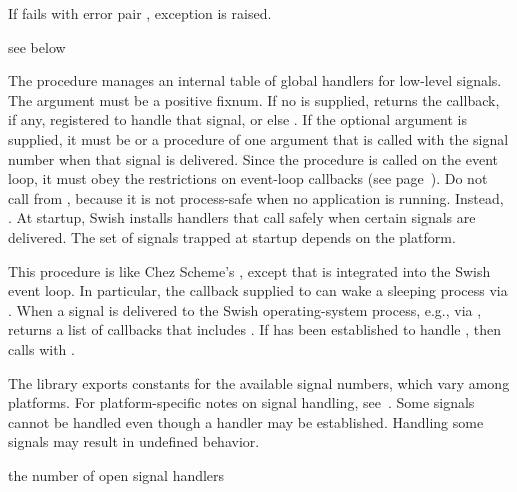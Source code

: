 If  fails with error pair , exception  is raised.

\begin{procedure}
\end{procedure}
\returns{} see below

The  procedure manages an internal table of
global handlers for low-level signals.
The  argument must be a positive fixnum.
If no  is supplied,  returns the
callback, if any, registered to handle that signal, or else .
If the optional  argument is supplied, it must be  or
a procedure of one argument that is called with the signal number when
that signal is delivered.
Since the  procedure is called on the event loop, it must obey
the restrictions on event-loop callbacks (see page~\pageref{page:event-loop}).
Do not call  from , because it is not
process-safe when no application is running.
Instead, .
At startup, Swish installs handlers that call 
safely when certain signals are delivered.
The set of signals trapped at startup depends on the platform.

This procedure is like Chez Scheme's , except
that  is integrated into the Swish event loop.
In particular, the callback supplied to  can wake a
sleeping process via .
When a signal  is delivered to the Swish operating-system process,
e.g., via ,  returns a list of
callbacks that includes .
If  has been established to handle ,
then  calls  with .

The  library exports constants for the available signal
numbers, which vary among platforms.
For platform-specific notes on signal handling, see~\cite{libuv}.
Some signals cannot be handled even though a handler may be established.
Handling some signals may result in undefined behavior.

\begin{procedure}
\end{procedure}
\returns{} the number of open signal handlers

